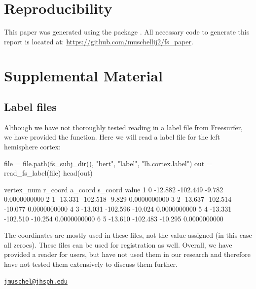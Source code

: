 \section{Reproducibility}\label{reproducibility}

This paper was generated using the  package
\citep{rticles}. All necessary code to generate this report is located
at: \url{https://github.com/muschellij2/fs_paper}.



\section{Supplemental Material}\label{supplemental-material}

\subsection{Label files}\label{label-files}

Although we have not thoroughly tested reading in a label file from
Freesurfer, we have provided the  function. Here
we will read a label file for the left hemisphere cortex:

\begin{Schunk}
\begin{Sinput}
file = file.path(fs_subj_dir(), "bert", "label", "lh.cortex.label")
out = read_fs_label(file)
head(out)
\end{Sinput}
\begin{Soutput}
  vertex_num r_coord  a_coord s_coord        value
1          0 -12.882 -102.449  -9.782 0.0000000000
2          1 -13.331 -102.518  -9.829 0.0000000000
3          2 -13.637 -102.514 -10.077 0.0000000000
4          3 -13.031 -102.596 -10.024 0.0000000000
5          4 -13.331 -102.510 -10.254 0.0000000000
6          5 -13.610 -102.483 -10.295 0.0000000000
\end{Soutput}
\end{Schunk}

The coordinates are mostly used in these files, not the value assigned
(in this case all zeroes). These files can be used for registration as
well. Overall, we have provided a reader for users, but have not used
them in our research and therefore have not tested them extensively to
discuss them further.

\address{%
John Muschelli\\
Johns Hopkins Bloomberg School of Public Health\\
Department of Biostatistics\\ 615 N Wolfe St, Baltimore, MD, 21205\\
}
\href{mailto:jmuschel@jhsph.edu}{\nolinkurl{jmuschel@jhsph.edu}}

